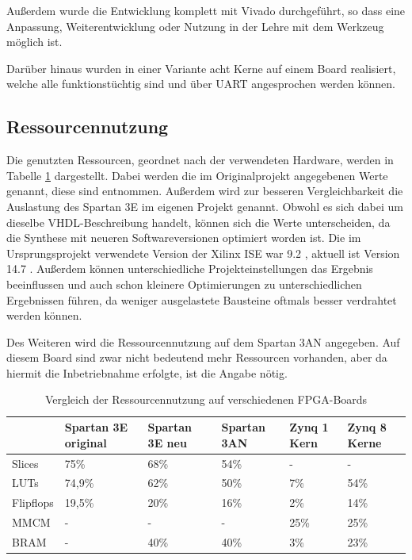 \documentclass[11pt,a4paper,titlepage]{article}
\begin{document}
Außerdem wurde die Entwicklung komplett mit Vivado durchgeführt, so dass eine Anpassung, Weiterentwicklung oder Nutzung in der Lehre mit dem Werkzeug möglich ist.

Darüber hinaus wurden in einer Variante acht Kerne auf einem Board realisiert, welche alle funktionstüchtig sind und über UART angesprochen werden können.

\subsection{Ressourcennutzung}

Die genutzten Ressourcen, geordnet nach der verwendeten Hardware, werden in Tabelle \ref{tab:VergleichRessourcen} dargestellt. Dabei werden die im Originalprojekt angegebenen Werte genannt, diese sind \cite[S. 140]{Boehme} entnommen. Außerdem wird zur besseren Vergleichbarkeit die Auslastung des Spartan 3E im eigenen Projekt genannt. Obwohl es sich dabei um dieselbe VHDL-Beschreibung handelt, können sich die Werte unterscheiden, da die Synthese mit neueren Softwareversionen optimiert worden ist. Die im Ursprungsprojekt verwendete Version der Xilinx ISE war 9.2 \cite[S. 42]{Boehme}, aktuell ist Version 14.7 \cite{ISE}. Außerdem können unterschiedliche Projekteinstellungen das Ergebnis beeinflussen und auch schon kleinere Optimierungen zu unterschiedlichen Ergebnissen führen, da weniger ausgelastete Bausteine oftmals besser verdrahtet werden können.

Des Weiteren wird die Ressourcennutzung auf dem Spartan 3AN angegeben. Auf diesem Board sind zwar nicht bedeutend mehr Ressourcen vorhanden, aber da hiermit die Inbetriebnahme erfolgte, ist die Angabe nötig.\\

\begin{table}[!ht]
\centering
\caption{Vergleich der Ressourcennutzung auf verschiedenen FPGA-Boards}
\label{tab:VergleichRessourcen}
\begin{tabular}{|l|l|l|l|l|l|}
\hline
			&Spartan 3E original&Spartan 3E neu	&Spartan 3AN&Zynq 1 Kern	&Zynq 8 Kerne\\
			\hline
Slices		&75\%				&68\%			&54\%		& - 			& - \\
LUTs		&74,9\%				&62\%			&50\%		&7\%			&54\%\\
Flipflops	&19,5\%				&20\%			&16\%		&2\%			&14\%\\
MMCM		& -					& - 			& - 		&25\%			&25\%\\
BRAM		& -					&40\%			&40\%		&3\%			&23\%\\
\hline
\end{tabular}
\end{table}
\end{document}
